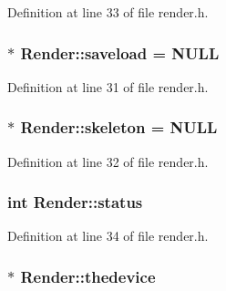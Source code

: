 Definition at line 33 of file render.\+h.

\hypertarget{class_render_ae359d4eb07503161a339ad8bfd79685e}{
\subsubsection[{saveload}]{$\ast$ Render\+::saveload = N\+U\+L\+L\hspace{0.3cm}{\ttfamily [protected]}}}\label{class_render_ae359d4eb07503161a339ad8bfd79685e}


Definition at line 31 of file render.\+h.

\hypertarget{class_render_aa6c02e21d3907a61880c5b3d723e588f}{
\subsubsection[{skeleton}]{$\ast$ Render\+::skeleton = N\+U\+L\+L\hspace{0.3cm}{\ttfamily [protected]}}}\label{class_render_aa6c02e21d3907a61880c5b3d723e588f}


Definition at line 32 of file render.\+h.

\hypertarget{class_render_af2d4c7677e317f9ac7cd115ffcc8c367}{
\subsubsection[{status}]{\setlength{\rightskip}{0pt plus 5cm}int Render\+::status\hspace{0.3cm}{\ttfamily [protected]}}}\label{class_render_af2d4c7677e317f9ac7cd115ffcc8c367}


Definition at line 34 of file render.\+h.

\hypertarget{class_render_aea72c3cd7f9b31257d99cd1be92fe550}{
\subsubsection[{thedevice}]{$\ast$ Render\+::thedevice\hspace{0.3cm}{\ttfamily [protected]}}}\label{class_render_aea72c3cd7f9b31257d99cd1be92fe550}


